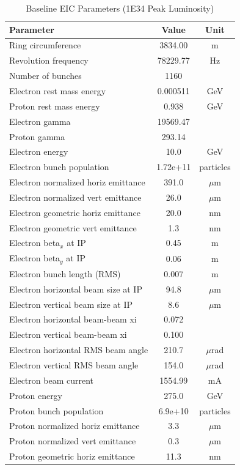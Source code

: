 \documentclass{article}
\begin{document}
\begin{longtable}{lcc}
\caption{Baseline EIC Parameters (1E34 Peak Luminosity)} \\
\toprule
Parameter & Value & Unit \\
\midrule
Ring circumference & 3834.00 & m \\
Revolution frequency & 78229.77 & Hz \\
Number of bunches & 1160 &  \\
Electron rest mass energy & 0.000511 & GeV \\
Proton rest mass energy & 0.938 & GeV \\
Electron gamma & 19569.47 &  \\
Proton gamma & 293.14 &  \\
Electron energy & 10.0 & GeV \\
Electron bunch population & 1.72e+11 & particles \\
Electron normalized horiz emittance & 391.0 & $\mu$m \\
Electron normalized vert emittance & 26.0 & $\mu$m \\
Electron geometric horiz emittance & 20.0 & nm \\
Electron geometric vert emittance & 1.3 & nm \\
Electron beta$_x$ at IP & 0.45 & m \\
Electron beta$_y$ at IP & 0.06 & m \\
Electron bunch length (RMS) & 0.007 & m \\
Electron horizontal beam size at IP & 94.8 & $\mu$m \\
Electron vertical beam size at IP & 8.6 & $\mu$m \\
Electron horizontal beam-beam xi & 0.072 &  \\
Electron vertical beam-beam xi & 0.100 &  \\
Electron horizontal RMS beam angle & 210.7 & $\mu$rad \\
Electron vertical RMS beam angle & 154.0 & $\mu$rad \\
Electron beam current & 1554.99 & mA \\
Proton energy & 275.0 & GeV \\
Proton bunch population & 6.9e+10 & particles \\
Proton normalized horiz emittance & 3.3 & $\mu$m \\
Proton normalized vert emittance & 0.3 & $\mu$m \\
Proton geometric horiz emittance & 11.3 & nm \\

\end{longtable}
\end{document}
